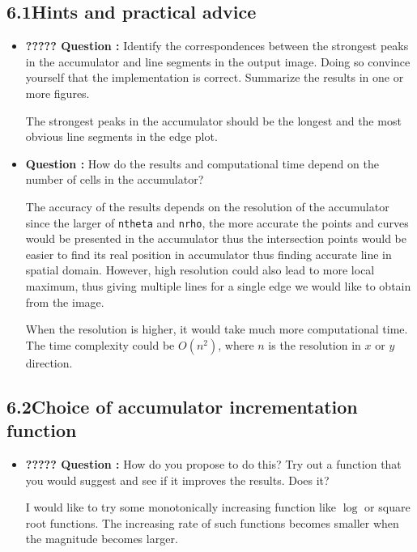 \documentclass[11pt,a4paper]{article}
\begin{document}
\subsection*{6.1\hspace{0.5cm}Hints and practical advice}
	\begin{itemize}
		\item\addtocounter{Counter}{1}\textbf{????? Question :} Identify the correspondences between the strongest peaks in the accumulator and line segments in the output image. Doing so convince yourself that the implementation is correct. Summarize the results in one or more figures.
			\par The strongest peaks in the accumulator should be the longest and the most obvious line segments in the edge plot.
		
		\item\addtocounter{Counter}{1}\textbf{Question :} How do the results and computational time depend on the number of cells in the accumulator?
			\par The accuracy of the results depends on the resolution of the accumulator since the larger of \texttt{ntheta} and \texttt{nrho}, the more accurate the points and curves would be presented in the accumulator thus the intersection points would be easier to find its real position in accumulator thus finding accurate line in spatial domain. However, high resolution could also lead to more local maximum, thus giving multiple lines for a single edge we would like to obtain from the image.
			\par When the resolution is higher, it would take much more computational time. The time complexity could be $O(n^{2})$, where $n$ is the resolution in $x$ or $y$ direction. 
	\end{itemize}

\subsection*{6.2\hspace{0.5cm}Choice of accumulator incrementation function}
	\begin{itemize}
		\item\addtocounter{Counter}{1}\textbf{????? Question :} How do you propose to do this? Try out a function that you would suggest and see if it improves the results. Does it?
			\par I would like to try some monotonically increasing function like $\log$ or square root functions. The increasing rate of such functions becomes smaller when the magnitude becomes larger.
	\end{itemize}
\end{document}
